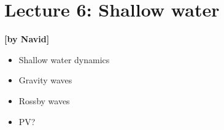 
\section{Lecture 6: Shallow water}\label{sec:lecture6}
\begin{flushright}\textbf{[by Navid]}\end{flushright}
  
 \begin{itemize}
   \item
   Shallow water dynamics
   \item
   Gravity waves
   \item
   Rossby waves
   \item
   PV?
 \end{itemize}
